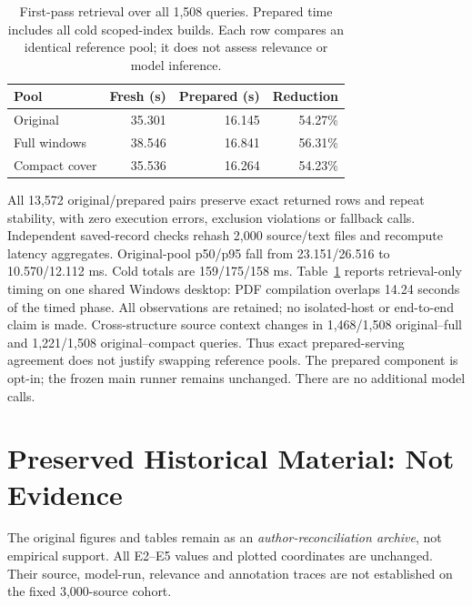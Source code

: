 \documentclass[11pt]{article}
\begin{document}
\begin{table}[t]
\centering\small
\begin{tabular}{lrrr}
\toprule
Pool & Fresh (s) & Prepared (s) & Reduction \\
\midrule
Original & 35.301 & 16.145 & 54.27\% \\
Full windows & 38.546 & 16.841 & 56.31\% \\
Compact cover & 35.536 & 16.264 & 54.23\% \\
\bottomrule
\end{tabular}
\caption{First-pass retrieval over all 1,508 queries. Prepared time includes
all cold scoped-index builds. Each row compares an identical reference pool;
it does not assess relevance or model inference.}
\label{tab:prepared-retrieval}
\end{table}

All 13,572 original/prepared pairs preserve exact returned rows and repeat
stability, with zero execution errors, exclusion violations or fallback
calls. Independent saved-record checks rehash 2,000 source/text files and
recompute latency aggregates. Original-pool p50/p95 fall from
23.151/26.516 to 10.570/12.112 ms. Cold totals are 159/175/158 ms.
Table~\ref{tab:prepared-retrieval} reports retrieval-only timing on one shared
Windows desktop: PDF compilation overlaps 14.24 seconds of the timed phase.
All observations are retained; no isolated-host or end-to-end claim is made.
Cross-structure source context changes in 1,468/1,508 original--full and
1,221/1,508 original--compact queries. Thus exact prepared-serving agreement
does not justify swapping reference pools. The prepared component is opt-in;
the frozen main runner remains unchanged. There are no additional model calls.

\section{Preserved Historical Material: Not Evidence}
\label{sec:legacy}
The original figures and tables remain as an \emph{author-reconciliation
archive}, not empirical support. All E2--E5 values and plotted coordinates
are unchanged. Their source, model-run, relevance and annotation traces
are not established on the fixed 3,000-source cohort.
\end{document}
